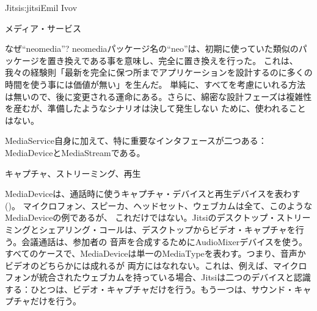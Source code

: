 \begin{aosachapter}{Jitsi}{s:jitsi}{Emil Ivov}
\begin{aosasect1}{メディア・サービス}
\begin{aosabox}{なぜ``neomedia''?}
neomediaパッケージ名の``neo''は、初期に使っていた類似のパッケージを置き換えである事を意味し、完全に置き換えを行った。
これは、我々の経験則「最新を完全に保つ所までアプリケーションを設計するのに多くの時間を使う事には価値が無い」を生んだ。
単純に、すべてを考慮にいれる方法は無いので、後に変更される運命にある。さらに、綿密な設計フェーズは複雑性を産むが、準備したようなシナリオは決して発生しない
ために、使われることはない。

\end{aosabox}

MediaService自身に加えて、特に重要なインタフェースが二つある：MediaDeviceとMediaStreamである。

\begin{aosasect2}{キャプチャ、ストリーミング、再生}

MediaDeviceは、通話時に使うキャプチャ・デバイスと再生デバイスを表わす()。
マイクロフォン、スピーカ、ヘッドセット、ウェブカムは全て、このようなMediaDeviceの例であるが、
これだけではない。Jitsiのデスクトップ・ストリーミングとシェアリング・コールは、デスクトップからビデオ・キャプチャを行う。会議通話は、参加者の
音声を合成するためにAudioMixerデバイスを使う。すべてのケースで、MediaDeviceは単一のMediaTypeを表わす。つまり、音声かビデオのどちらかには成れるが
両方にはなれない。これは、例えば、マイクロフォンが統合されたウェブカムを持っている場合、Jitsiは二つのデバイスと認識する：ひとつは、ビデオ・キャプチャだけを行う。もう一つは、サウンド・キャプチャだけを行う。


\end{aosasect2}
\end{aosasect1}
\end{aosachapter}
